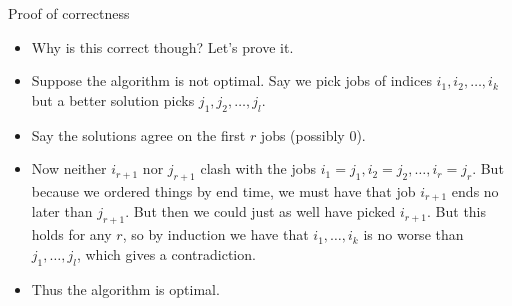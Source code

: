 \documentclass{beamer}
\begin{document}
\begin{frame}[plain]{Proof of correctness}
    \begin{itemize}
        \item Why is this correct though? Let's prove it.
        \item Suppose the algorithm is not optimal. Say we pick jobs of indices $i_1, i_2, \dots, i_k$ but a better solution picks $j_1, j_2, \dots, j_l$.
        \item Say the solutions agree on the first $r$ jobs (possibly $0$). 
        \item Now neither $i_{r+1}$ nor $j_{r+1}$ clash with the jobs $i_1 = j_1, i_2 = j_2, \dots, i_r = j_r$. But because we ordered things by end time, we must have that job $i_{r+1}$ ends no later than $j_{r+1}$. But then we could just as well have picked $i_{r+1}$. But this holds for any $r$, so by induction we have that $i_1, \dots, i_k$ is no worse than $j_1, \dots, j_l$, which gives a contradiction.
        \item Thus the algorithm is optimal.
    \end{itemize}
\end{frame}
\end{document}
